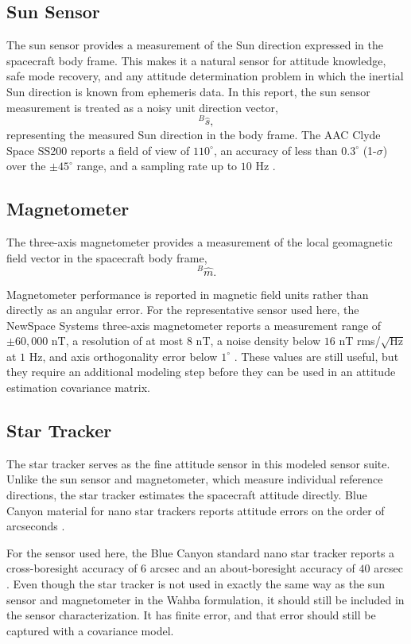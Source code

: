 \documentclass[12pt]{article}
\begin{document}
\subsection{Sun Sensor}

The sun sensor provides a measurement of the Sun direction expressed in the spacecraft body frame. This makes it a natural sensor for  attitude knowledge, safe mode recovery, and any attitude determination problem in which the inertial Sun direction is known from ephemeris data. In this report, the sun sensor measurement is treated as a noisy unit direction vector,
\[
{}^{B}\hat{s},
\]
representing the measured Sun direction in the body frame. The AAC Clyde Space SS200 reports a field of view of \(110^\circ\), an accuracy of less than \(0.3^\circ\) (1-\(\sigma\)) over the \(\pm 45^\circ\) range, and a sampling rate up to \(10\) Hz \cite{AAC_SS200}.

\subsection{Magnetometer}

The three-axis magnetometer provides a measurement of the local geomagnetic field vector in the spacecraft body frame,
\[
{}^{B}\hat{m}.
\]

Magnetometer performance is reported in magnetic field units rather than directly as an angular error. For the representative sensor used here, the NewSpace Systems three-axis magnetometer reports a measurement range of \(\pm 60{,}000\) nT, a resolution of at most \(8\) nT, a noise density below \(16\) nT rms/\(\sqrt{\text{Hz}}\) at \(1\) Hz, and axis orthogonality error below \(1^\circ\) \cite{NSS_MAG}. These values are still useful, but they require an additional modeling step before they can be used in an attitude estimation covariance matrix. 

\subsection{Star Tracker}

The star tracker serves as the fine attitude sensor in this modeled sensor suite. Unlike the sun sensor and magnetometer, which measure individual reference directions, the star tracker estimates the spacecraft attitude directly. Blue Canyon material for nano star trackers reports attitude errors on the order of arcseconds \cite{BCT_NST}.

For the sensor used here, the Blue Canyon standard nano star tracker reports a cross-boresight accuracy of \(6\) arcsec and an about-boresight accuracy of \(40\) arcsec \cite{BCT_NST}. Even though the star tracker is not used in exactly the same way as the sun sensor and magnetometer in the Wahba formulation, it should still be included in the sensor characterization. It has finite error, and that error should still be captured with a covariance model.
\end{document}
